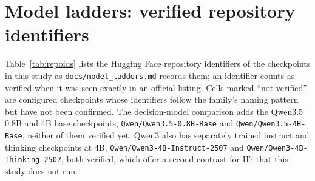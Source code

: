 \section{Model ladders: verified repository identifiers}
\label{app:ladders}

Table~\ref{tab:repoids} lists the Hugging Face repository identifiers of the checkpoints in this study as \texttt{docs/model\_ladders.md} records them; an identifier counts as verified when it was seen exactly in an official listing. Cells marked ``not verified'' are configured checkpoints whose identifiers follow the family's naming pattern but have not been confirmed. The decision-model comparison adds the Qwen3.5 0.8B and 4B base checkpoints, \texttt{Qwen/Qwen3.5-0.8B-Base} and \texttt{Qwen/Qwen3.5-4B-Base}, neither of them verified yet. Qwen3 also has separately trained instruct and thinking checkpoints at 4B, \texttt{Qwen/Qwen3-4B-Instruct-2507} and \texttt{Qwen/Qwen3-4B-Thinking-2507}, both verified, which offer a second contrast for H7 that this study does not run. 

